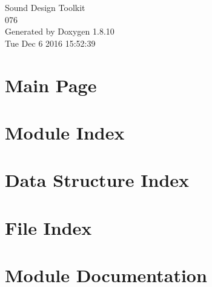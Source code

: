\documentclass[twoside]{book}
\newcommand{\+}{\discretionary{\mbox{\scriptsize$\hookleftarrow$}}{}{}}
\newcommand{\clearemptydoublepage}{%
  \newpage{\pagestyle{empty}\cleardoublepage}%
}
\begin{document}
\hypersetup{pageanchor=false,
             bookmarks=true,
             bookmarksnumbered=true,
             pdfencoding=unicode
            }
\begin{titlepage}
\vspace*{7cm}
\begin{center}%
{\Large Sound Design Toolkit \\[1ex]\large 076 }\\
\vspace*{1cm}
{\large Generated by Doxygen 1.8.10}\\
\vspace*{0.5cm}
{\small Tue Dec 6 2016 15:52:39}\\
\end{center}
\end{titlepage}
\clearemptydoublepage
\tableofcontents
\clearemptydoublepage
{}
\hypersetup{pageanchor=true}

\chapter{Main Page}
\label{index}\hypertarget{index}{}
\chapter{Module Index}

\chapter{Data Structure Index}

\chapter{File Index}

\chapter{Module Documentation}












































\end{document}
